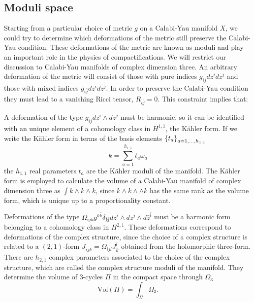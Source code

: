 \subsection{Moduli space}

Starting from a particular choice of metric $g$ on a Calabi-Yau manifold $X$, we could try to determine
which deformations of the metric still preserve the Calabi-Yau condition.
These deformations of the metric are known as moduli and play an important role in the physics of compactifications.
We will restrict our discussion to Calabi-Yau manifolds of complex dimension three.
An arbitrary deformation of the metric will consist of those with pure 
indices $g_{ij}dz^i dz^j$ and those with mixed indices $g_{i\bar j}dz^i dz^{\bar j}$.
In order to preserve the Calabi-Yau condition they must lead to a vanishing Ricci tensor, $R_{i\bar j}=0$.
This constraint implies that:

 A deformation of the type $g_{ij}dz^i \wedge dz^j$ must be harmonic, so it can be identified with an unique element of a cohomology class in $H^{1,1}$, the Kähler form.
 If we write the Kähler form in terms of the basis elements $\qty{t_a}_{a=1,\ldots,h_{1,1}}$
\begin{equation}
k=\sum_{a=1}^{h_{1,1}}t_a \omega_a
\end{equation}
the $h_{1,1}$ real parameters $t_a$ are the Kähler moduli of the manifold.
The Kähler form is employed to calculate the volume of a Calabi-Yau manifold of complex dimension three as
$\int k\wedge k\wedge k$, since $k\wedge k\wedge \wedge k$ has the same rank as the
volume form, which is unique up to a proportionality constant.

Deformations of the type $\Omega_{ijk}g^{k\bar k}\delta_{\bar k\bar l}dz^i\wedge dz^j \wedge d\bar z^{\bar l}$ must be a harmonic form belonging to a cohomology class in $H^{2,1}$.
These deformations correspond to deformations of the complex structure, 
since the choice of a complex structure is related to a $(2,1)$-form  $J_{ij\bar k}= \Omega_{ijl}J^l_{\bar k}$ 
obtained from the holomorphic three-form.
There are $h_{2,1}$ complex parameters associated to the choice of the complex structure, which are called the complex structure moduli of the manifold.
They determine the volume of 3-cycles $\Pi$ in the compact space through $\Omega_3$ 
\begin{equation}
  \mathrm{Vol}(\Pi)=\int_\Pi \Omega_3.
\end{equation}

